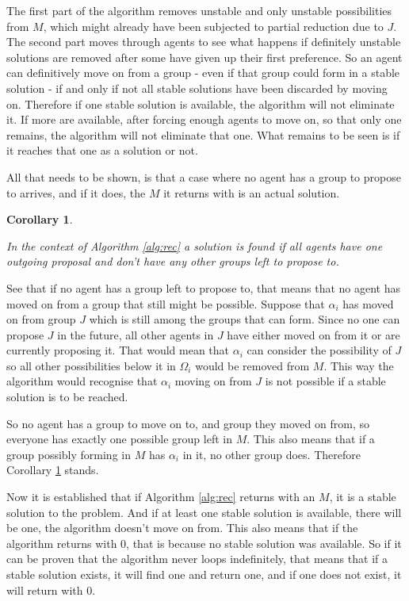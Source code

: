 \documentclass{elsarticle}
\newtheorem{mysta}{Corollary}
\begin{document}
The first part of the algorithm removes unstable and only unstable possibilities from $M$, which might already have been subjected to partial reduction due to $J$. The second part moves through agents to see what happens if definitely unstable solutions are removed after some have given up their first preference. So an agent can definitively move on from a group - even if that group could form in a stable solution - if and only if not all stable solutions have been discarded by moving on. Therefore if one stable solution is available, the algorithm will not eliminate it. If more are available, after forcing enough agents to move on, so that only one remains, the algorithm will not eliminate that one. What remains to be seen is if it reaches that one as a solution or not.

All that needs to be shown, is that a case where no agent has a group to propose to arrives, and if it does, the $M$ it returns with is an actual solution. 

\begin{mysta}
\label{sta:found}

In the context of Algorithm \ref{alg:rec} a solution is found if all agents have one outgoing proposal and don't have any other groups left to propose to.

\end{mysta}

See that if no agent has a group left to propose to, that means that no agent has moved on from a group that still might be possible. Suppose that $\alpha_i$ has moved on from group $J$ which is still among the groups that can form. Since no one can propose $J$ in the future, all other agents in $J$ have either moved on from it or are currently proposing it. That would mean that $\alpha_i$ can consider the possibility of $J$ so all other possibilities below it in $\Omega_i$ would be removed from $M$. This way the algorithm would recognise that $\alpha_i$ moving on from $J$ is not possible if a stable solution is to be reached. 

So no agent has a group to move on to, and group they moved on from, so everyone has exactly one possible group left in $M$. This also means that if a group possibly forming in $M$ has $\alpha_i$ in it, no other group does. Therefore Corollary \ref{sta:found} stands.

Now it is established that if Algorithm \ref{alg:rec} returns with an $M$, it is a stable solution to the problem. And if at least one stable solution is available, there will be one, the algorithm doesn't move on from. This also means that if the algorithm returns with 0, that is because no stable solution was available. So if it can be proven that the algorithm never loops indefinitely, that means that if a stable solution exists, it will find one and return one, and if one does not exist, it will return with 0.
\end{document}
